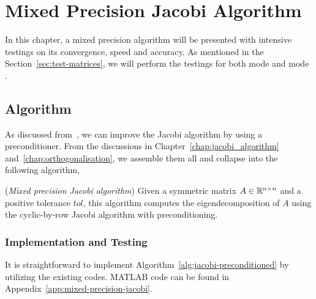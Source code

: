 \chapter{Mixed Precision Jacobi Algorithm}\label{chap:mixed-precision}

In this chapter, a mixed precision algorithm will be presented with intensive testings on its convergence, speed and accuracy. As mentioned in the Section~\ref{sec:test-matrices}, we will perform the testings for both mode  and mode . 

\section{Algorithm}\label{sec:precondition-algorithm}

As discussed from~, we can improve the Jacobi algorithm by using a preconditioner. From the discussions in Chapter~\ref{chap:jacobi_algorithm} and~\ref{chap:orthogonalisation}, we assemble them all and collapse into the following algorithm,
\begin{algorithm}[ht]
  \caption{(\textit{Mixed precision Jacobi algorithm}) Given a symmetric matrix $A\in\mathbb{R}^{n\times n}$ and a positive tolerance $tol$, this algorithm computes the eigendecomposition of $A$ using the cyclic-by-row Jacobi algorithm with preconditioning.}
  \label{alg:jacobi-preconditioned}
  \begin{algorithmic}[1]
  \end{algorithmic}
\end{algorithm}

\subsection{Implementation and Testing}\label{sec:ref111}

It is straightforward to implement Algorithm~\ref{alg:jacobi-preconditioned} by utilizing the existing codes. MATLAB code can be found in Appendix~\ref{app:mixed-precision-jacobi}. 

